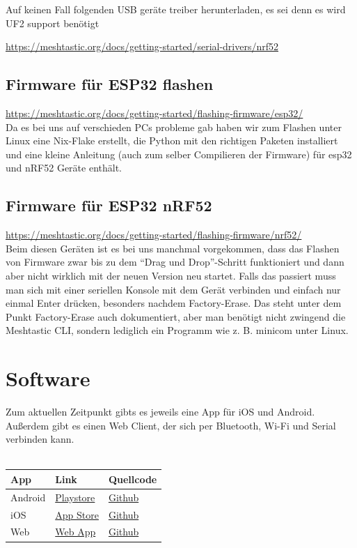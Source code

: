 \documentclass[12pt,a4paper]{article}
\begin{document}
Auf keinen Fall folgenden USB geräte treiber herunterladen, es sei denn es wird UF2 support benötigt

\url{https://meshtastic.org/docs/getting-started/serial-drivers/nrf52}

\subsection{Firmware für ESP32 flashen}
\url{https://meshtastic.org/docs/getting-started/flashing-firmware/esp32/}\\
Da es bei uns auf verschieden PCs probleme gab haben wir zum Flashen unter Linux eine Nix-Flake erstellt, die Python mit den richtigen Paketen installiert und eine kleine Anleitung (auch zum selber Compilieren der Firmware) für esp32 und nRF52 Geräte enthält.\\

\subsection{Firmware für ESP32 nRF52}
\url{https://meshtastic.org/docs/getting-started/flashing-firmware/nrf52/}\\
Beim diesen Geräten ist es bei uns manchmal vorgekommen, dass das Flashen von Firmware zwar bis zu dem “Drag und Drop”-Schritt funktioniert und dann aber nicht wirklich mit der neuen Version neu startet. Falls das passiert muss man sich mit einer seriellen Konsole mit dem Gerät verbinden und einfach nur einmal Enter drücken, besonders nachdem Factory-Erase. Das steht unter dem Punkt Factory-Erase auch dokumentiert, aber man benötigt nicht zwingend die Meshtastic CLI, sondern lediglich ein Programm wie z. B. minicom unter Linux.
\section{Software}
Zum aktuellen Zeitpunkt gibts es jeweils eine App für iOS und Android. Außerdem gibt es einen Web Client, der sich per Bluetooth, Wi-Fi und Serial verbinden kann.\\
\\
\begin{tabular}[h]{l | l | l}
App & Link & Quellcode \\
\hline
Android  & \href{https://play.google.com/store/apps/details?id=com.geeksville.mesh}{Playstore} & \href{https://github.com/meshtastic/Meshtastic-Android}{Github} \\
\hline
iOS & \href{https://apps.apple.com/us/app/meshtastic/id1586432531}{App Store} & \href{https://github.com/meshtastic/Meshtastic-Apple}{Github}  \\
\hline
Web & \href{https://client.meshtastic.org/}{Web App} & \href{https://github.com/meshtastic/web}{Github} \\
\end{tabular}\\
\\
\end{document}
